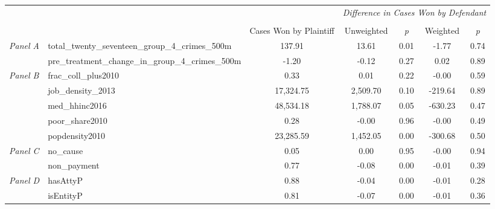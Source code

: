 \begin{tabular}{llccccc}
\toprule
 &  & \textit{} & \multicolumn{4}{c}{\textit{Difference in Cases Won by Defendant}} \\
\cline{4-7}
\\
 &  & Cases Won by Plaintiff & Unweighted & \emph{p} & Weighted & \emph{p} \\
\midrule
\multirow[c]{2}{3cm}{\textit{Panel A}} & total_twenty_seventeen_group_4_crimes_500m & 137.91 & 13.61 & 0.01 & -1.77 & 0.74 \\
 & pre_treatment_change_in_group_4_crimes_500m & -1.20 & -0.12 & 0.27 & 0.02 & 0.89 \\
\cline{1-7}
\multirow[c]{5}{3cm}{\textit{Panel B}} & frac_coll_plus2010 & 0.33 & 0.01 & 0.22 & -0.00 & 0.59 \\
 & job_density_2013 & 17,324.75 & 2,509.70 & 0.10 & -219.64 & 0.89 \\
 & med_hhinc2016 & 48,534.18 & 1,788.07 & 0.05 & -630.23 & 0.47 \\
 & poor_share2010 & 0.28 & -0.00 & 0.96 & -0.00 & 0.49 \\
 & popdensity2010 & 23,285.59 & 1,452.05 & 0.00 & -300.68 & 0.50 \\
\cline{1-7}
\multirow[c]{2}{3cm}{\textit{Panel C}} & no_cause & 0.05 & 0.00 & 0.95 & -0.00 & 0.94 \\
 & non_payment & 0.77 & -0.08 & 0.00 & -0.01 & 0.39 \\
\cline{1-7}
\multirow[c]{2}{3cm}{\textit{Panel D}} & hasAttyP & 0.88 & -0.04 & 0.00 & -0.01 & 0.28 \\
 & isEntityP & 0.81 & -0.07 & 0.00 & -0.01 & 0.36 \\
\cline{1-7}
\bottomrule
\end{tabular}
